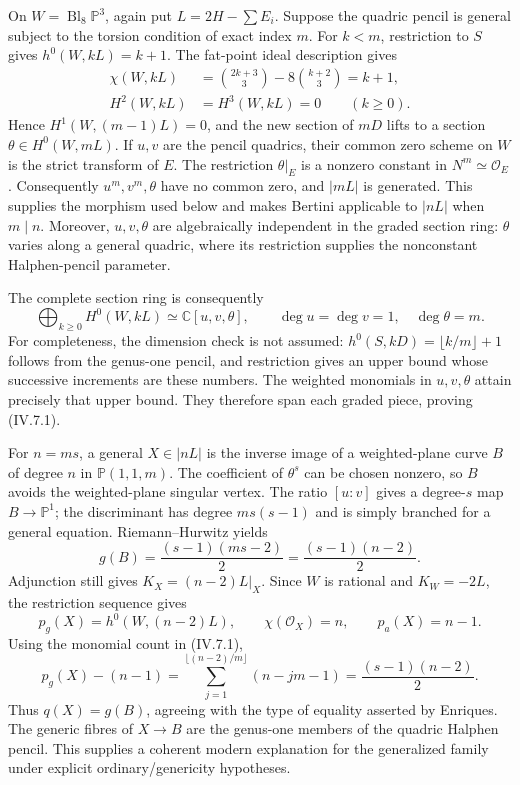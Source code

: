 On \(W=\operatorname{Bl}_8\mathbb P^3\), again put \(L=2H-\sum E_i\). Suppose the quadric pencil is general subject to the torsion condition of exact index \(m\). For \(k<m\), restriction to \(S\) gives \(h^0(W,kL)=k+1\). The fat-point ideal description gives \[
 \begin{aligned}
 \chi(W,kL)&=\binom{2k+3}{3}-8\binom{k+2}{3}=k+1,\\
 H^2(W,kL)&=H^3(W,kL)=0 \qquad(k\geq0).
 \end{aligned}
\] Hence \(H^1(W,(m-1)L)=0\), and the new section of \(mD\) lifts to a section \(\theta\in H^0(W,mL)\). If \(u,v\) are the pencil quadrics, their common zero scheme on \(W\) is the strict transform of \(E\). The restriction \(\theta|_E\) is a nonzero constant in \(N^m\simeq\mathcal O_E\). Consequently \(u^m,v^m,\theta\) have no common zero, and \(|mL|\) is generated. This supplies the morphism used below and makes Bertini applicable to \(|nL|\) when \(m\mid n\). Moreover, \(u,v,\theta\) are algebraically independent in the graded section ring: \(\theta\) varies along a general quadric, where its restriction supplies the nonconstant Halphen-pencil parameter.

The complete section ring is consequently \[
 \bigoplus_{k\geq0}H^0(W,kL)\simeq\mathbb C[u,v,\theta],
 \qquad\deg u=\deg v=1,\quad\deg\theta=m.
 \tag{IV.7.1}
\] For completeness, the dimension check is not assumed: \(h^0(S,kD)=\lfloor k/m\rfloor+1\) follows from the genus-one pencil, and restriction gives an upper bound whose successive increments are these numbers. The weighted monomials in \(u,v,\theta\) attain precisely that upper bound. They therefore span each graded piece, proving (IV.7.1).

For \(n=ms\), a general \(X\in|nL|\) is the inverse image of a weighted-plane curve \(B\) of degree \(n\) in \(\mathbb P(1,1,m)\). The coefficient of \(\theta^s\) can be chosen nonzero, so \(B\) avoids the weighted-plane singular vertex. The ratio \([u:v]\) gives a degree-\(s\) map \(B\to\mathbb P^1\); the discriminant has degree \(ms(s-1)\) and is simply branched for a general equation. Riemann--Hurwitz yields \[
 g(B)=\frac{(s-1)(ms-2)}2=\frac{(s-1)(n-2)}2.
 \tag{IV.7.2}
\] Adjunction still gives \(K_X=(n-2)L|_X\). Since \(W\) is rational and \(K_W=-2L\), the restriction sequence gives \[
 p_g(X)=h^0(W,(n-2)L),\qquad
 \chi(\mathcal O_X)=n,\qquad p_a(X)=n-1.
\] Using the monomial count in (IV.7.1), \[
 p_g(X)-(n-1)
 =\sum_{j=1}^{\lfloor(n-2)/m\rfloor}(n-jm-1)
 =\frac{(s-1)(n-2)}2.
\] Thus \(q(X)=g(B)\), agreeing with the type of equality asserted by Enriques. The generic fibres of \(X\to B\) are the genus-one members of the quadric Halphen pencil. This supplies a coherent modern explanation for the generalized family under explicit ordinary/genericity hypotheses.

